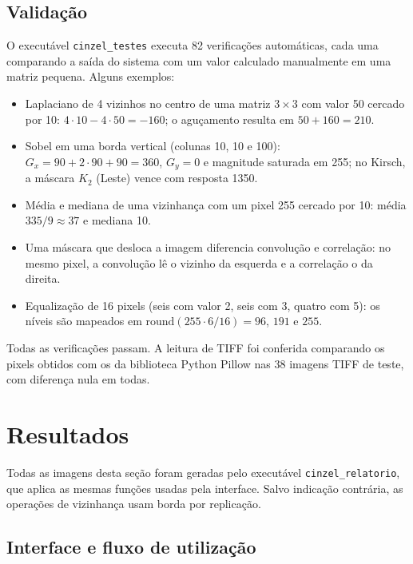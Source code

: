\documentclass[11pt,a4paper]{article}
\begin{document}
\subsection{Validação}

O executável \texttt{cinzel\_testes} executa 82 verificações automáticas, cada uma comparando
a saída do sistema com um valor calculado manualmente em uma matriz pequena. Alguns exemplos:
\begin{itemize}
  \item Laplaciano de 4 vizinhos no centro de uma matriz $3 \times 3$ com valor 50 cercado
        por 10: $4 \cdot 10 - 4 \cdot 50 = -160$; o aguçamento resulta em $50 + 160 = 210$.
  \item Sobel em uma borda vertical (colunas 10, 10 e 100): $G_x = 90 + 2 \cdot 90 + 90 = 360$,
        $G_y = 0$ e magnitude saturada em 255; no Kirsch, a máscara $K_2$ (Leste) vence com
        resposta 1350.
  \item Média e mediana de uma vizinhança com um pixel 255 cercado por 10: média
        $335/9 \approx 37$ e mediana 10.
  \item Uma máscara que desloca a imagem diferencia convolução e correlação: no mesmo pixel,
        a convolução lê o vizinho da esquerda e a correlação o da direita.
  \item Equalização de 16 pixels (seis com valor 2, seis com 3, quatro com 5): os níveis são
        mapeados em $\mathrm{round}(255 \cdot 6/16) = 96$, $191$ e $255$.
\end{itemize}
Todas as verificações passam. A leitura de TIFF foi conferida comparando os pixels obtidos
com os da biblioteca Python Pillow nas 38 imagens TIFF de teste, com diferença nula em todas.

\section{Resultados}

Todas as imagens desta seção foram geradas pelo executável \texttt{cinzel\_relatorio}, que
aplica as mesmas funções usadas pela interface. Salvo indicação contrária, as operações de
vizinhança usam borda por replicação.

\subsection{Interface e fluxo de utilização}
\end{document}

